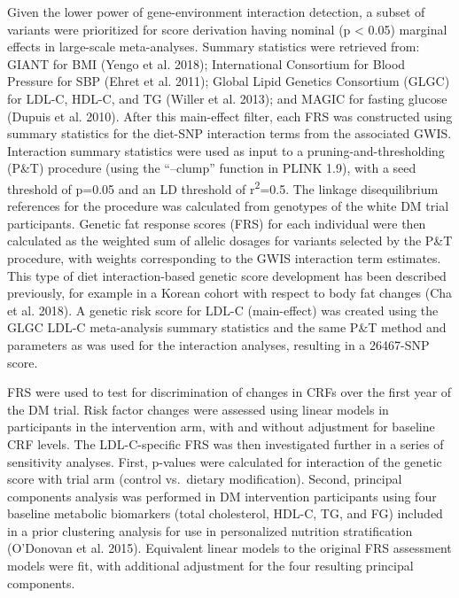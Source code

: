 \documentclass[]{article}
\begin{document}
Given the lower power of gene-environment interaction detection, a
subset of variants were prioritized for score derivation having nominal
(p \textless{} 0.05) marginal effects in large-scale meta-analyses.
Summary statistics were retrieved from: GIANT for BMI (Yengo et al.
2018); International Consortium for Blood Pressure for SBP (Ehret et al.
2011); Global Lipid Genetics Consortium (GLGC) for LDL-C, HDL-C, and TG
(Willer et al. 2013); and MAGIC for fasting glucose (Dupuis et al.
2010). After this main-effect filter, each FRS was constructed using
summary statistics for the diet-SNP interaction terms from the
associated GWIS. Interaction summary statistics were used as input to a
pruning-and-thresholding (P\&T) procedure (using the ``--clump''
function in PLINK 1.9), with a seed threshold of p=0.05 and an LD
threshold of r\textsuperscript{2}=0.5. The linkage disequilibrium
references for the procedure was calculated from genotypes of the white
DM trial participants. Genetic fat response scores (FRS) for each
individual were then calculated as the weighted sum of allelic dosages
for variants selected by the P\&T procedure, with weights corresponding
to the GWIS interaction term estimates. This type of diet
interaction-based genetic score development has been described
previously, for example in a Korean cohort with respect to body fat
changes (Cha et al. 2018). A genetic risk score for LDL-C (main-effect)
was created using the GLGC LDL-C meta-analysis summary statistics and
the same P\&T method and parameters as was used for the interaction
analyses, resulting in a 26467-SNP score.

FRS were used to test for discrimination of changes in CRFs over the
first year of the DM trial. Risk factor changes were assessed using
linear models in participants in the intervention arm, with and without
adjustment for baseline CRF levels. The LDL-C-specific FRS was then
investigated further in a series of sensitivity analyses. First,
p-values were calculated for interaction of the genetic score with trial
arm (control vs.~dietary modification). Second, principal components
analysis was performed in DM intervention participants using four
baseline metabolic biomarkers (total cholesterol, HDL-C, TG, and FG)
included in a prior clustering analysis for use in personalized
nutrition stratification (O'Donovan et al. 2015). Equivalent linear
models to the original FRS assessment models were fit, with additional
adjustment for the four resulting principal components.
\end{document}

